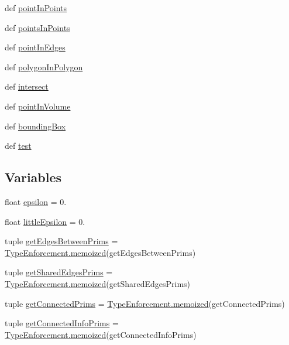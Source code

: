 \begin{DoxyCompactItemize}
def \hyperlink{namespacelib_1_1_geo_math_ab307d39d847e30b824feead18fd54932}{point\-In\-Points}
\item 
def \hyperlink{namespacelib_1_1_geo_math_a59f948c20758493b8122802ecefbd711}{points\-In\-Points}
\item 
def \hyperlink{namespacelib_1_1_geo_math_a4a6d500dbfbf932763381e28be9f38fc}{point\-In\-Edges}
\item 
def \hyperlink{namespacelib_1_1_geo_math_aefed42eb516fc5a143efdf37629a909b}{polygon\-In\-Polygon}
\item 
def \hyperlink{namespacelib_1_1_geo_math_aabf0357305a277647ca37d41a655da3f}{intersect}
\item 
def \hyperlink{namespacelib_1_1_geo_math_a88fd1d1e9dda19c732601c715b33e8f1}{point\-In\-Volume}
\item 
def \hyperlink{namespacelib_1_1_geo_math_a225cc3453ca9edbf4a36ed8c42df9f36}{bounding\-Box}
\item 
def \hyperlink{namespacelib_1_1_geo_math_a6ddc39571baf8c16cee0d2d9519bf770}{test}
\end{DoxyCompactItemize}
\subsection*{Variables}
\begin{DoxyCompactItemize}
\item 
float \hyperlink{namespacelib_1_1_geo_math_af51b959f0f48e43a0811364de8f1f72d}{epsilon} = 0.
\item 
float \hyperlink{namespacelib_1_1_geo_math_aae6879b7dc418047950472a7d708af1a}{little\-Epsilon} = 0.
\item 
tuple \hyperlink{namespacelib_1_1_geo_math_a44757a3ba3640c0b77bbf9c46f4761bc}{get\-Edges\-Between\-Prims} = \hyperlink{classlib_1_1_type_enforcement_1_1memoized}{Type\-Enforcement.\-memoized}(get\-Edges\-Between\-Prims)
\item 
tuple \hyperlink{namespacelib_1_1_geo_math_abbdbbbb024313ba34828d1aab8ff876d}{get\-Shared\-Edges\-Prims} = \hyperlink{classlib_1_1_type_enforcement_1_1memoized}{Type\-Enforcement.\-memoized}(get\-Shared\-Edges\-Prims)
\item 
tuple \hyperlink{namespacelib_1_1_geo_math_a7fdec417c173a462923fdbc35f5b6191}{get\-Connected\-Prims} = \hyperlink{classlib_1_1_type_enforcement_1_1memoized}{Type\-Enforcement.\-memoized}(get\-Connected\-Prims)
\item 
tuple \hyperlink{namespacelib_1_1_geo_math_a525ce7e416a909971e86b333cad41791}{get\-Connected\-Info\-Prims} = \hyperlink{classlib_1_1_type_enforcement_1_1memoized}{Type\-Enforcement.\-memoized}(get\-Connected\-Info\-Prims)
\end{DoxyCompactItemize}


